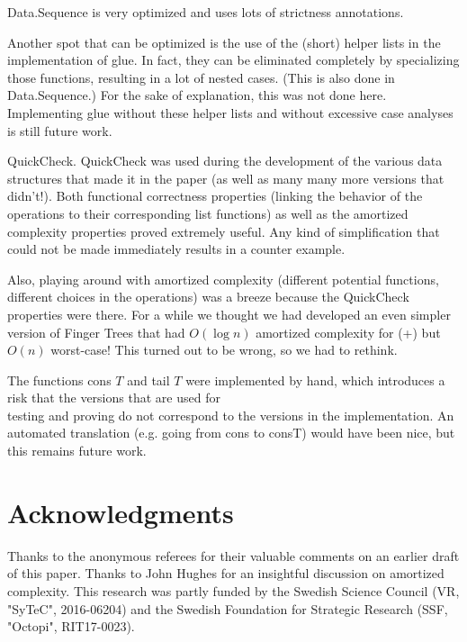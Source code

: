 \documentclass[10pt]{article}
\begin{document}
Data.Sequence is very optimized and uses lots of strictness annotations.

Another spot that can be optimized is the use of the (short) helper lists in the implementation of glue. In fact, they can be eliminated completely by specializing those functions, resulting in a lot of nested cases. (This is also done in Data.Sequence.) For the sake of explanation, this was not done here. Implementing glue without these helper lists and without excessive case analyses is still future work.

QuickCheck. QuickCheck was used during the development of the various data structures that made it in the paper (as well as many many more versions that didn't!). Both functional correctness properties (linking the behavior of the operations to their corresponding list functions) as well as the amortized complexity properties proved extremely useful. Any kind of simplification that could not be made immediately results in a counter example.

Also, playing around with amortized complexity (different potential functions, different choices in the operations) was a breeze because the QuickCheck properties were there. For a while we thought we had developed an even simpler version of Finger Trees that had $O(\log n)$ amortized complexity for (+) but $O(n)$ worst-case! This turned out to be wrong, so we had to rethink.

The functions cons $T$ and tail $T$ were implemented by hand, which introduces a risk that the versions that are used for\\
testing and proving do not correspond to the versions in the implementation. An automated translation (e.g. going from cons to consT) would have been nice, but this remains future work.

\section*{Acknowledgments}
Thanks to the anonymous referees for their valuable comments on an earlier draft of this paper. Thanks to John Hughes for an insightful discussion on amortized complexity. This research was partly funded by the Swedish Science Council (VR, "SyTeC", 2016-06204) and the Swedish Foundation for Strategic Research (SSF, "Octopi", RIT17-0023).
\end{document}
